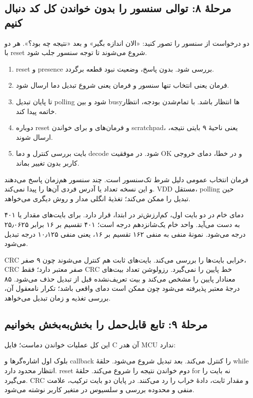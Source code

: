 \subsection{مرحلهٔ ۸: توالی سنسور را بدون خواندن کل کد دنبال کنیم}
دو درخواست از سنسور را تصور کنید: «الان اندازه بگیر» و بعد «نتیجه چه بود؟». هر دو با reset شروع می‌شوند تا توجه سنسور جلب شود.
\begin{enumerate}
\item reset و presence بررسی شود. بدون پاسخ، وضعیت نبود قطعه برگردد.
\item فرمان
یعنی انتخاب تنها سنسور و فرمان
یعنی شروع تبدیل دما ارسال شود.
\item تا پایان تبدیل polling شود و بین busyها انتظار باشد. با تمام‌شدن بودجه، انتظار خاتمه پیدا کند.
\item دوباره reset و فرمان‌های
و
برای خواندن scratchpad، یعنی ناحیهٔ ۹ بایتی نتیجه، ارسال شوند.
\item بایت بررسی کنترل و دما decode شود. در موفقیت OK و در خطا، دمای خروجی کاربر بدون تغییر بماند.
\end{enumerate}
فرمان انتخاب عمومی دلیل شرط تک‌سنسور است. چند سنسور هم‌زمان پاسخ می‌دهند و این نسخه تعداد یا آدرس فردی آن‌ها را پیدا نمی‌کند. VDD مستقل، polling حین تبدیل را ممکن می‌کند؛ تغذیهٔ انگلی مدار و روش دیگری می‌خواهد.

دمای خام در دو بایت اول، کم‌ارزش‌تر در ابتدا، قرار دارد. برای بایت‌های
مقدار
یا ۴۰۱ به دست می‌آید. واحد خام یک‌شانزدهم درجه است؛ ۴۰۱ تقسیم بر ۱۶ برابر ۲۵٫۰۶۲۵ درجه می‌شود. نمونهٔ منفی
به منفی ۱۶۲ تقسیم بر ۱۶، یعنی منفی ۱۰٫۱۲۵ درجه تبدیل می‌شود.

CRC خرابی بایت‌ها را بررسی می‌کند. بایت‌های ثابت هم کنترل می‌شوند چون ۹ صفر، CRC صفر معتبر دارد؛ فقط CRC خط پایین را نمی‌گیرد. رزولوشن تعداد بیت‌های معنادار پایین را مشخص می‌کند و بیت تعریف‌نشده قبل از تبدیل حذف می‌شود. ۸۵ درجهٔ معتبر پذیرفته می‌شود چون ممکن است دمای واقعی باشد؛ تکرار نامعقول آن، بررسی تغذیه و زمان تبدیل می‌خواهد.

\subsection{مرحلهٔ ۹: تابع قابل‌حمل را بخش‌به‌بخش بخوانیم}
این کل عملیات خواندن دماست؛ فایل C آن هدر MCU ندارد:
\begin{LTR}

\end{LTR}
بلوک اول اشاره‌گرها و callback را کنترل می‌کند. بعد تبدیل شروع می‌شود. حلقۀ while انتظار محدود دارد. reset دوم خواندن نتیجه را شروع می‌کند. حلقۀ for نه بایت را می‌گیرد. CRC و مقدار ثابت، دادهٔ خراب را رد می‌کنند. در پایان دو بایت ترکیب، علامت منفی و محدوده بررسی و سلسیوس در متغیر کاربر نوشته می‌شود.

